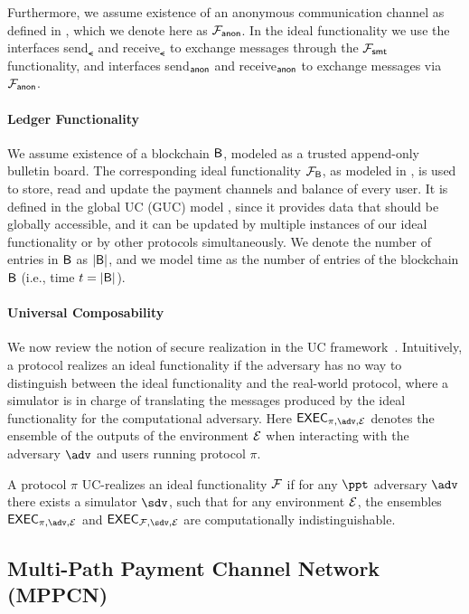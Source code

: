 Furthermore, we assume existence of an anonymous communication channel as defined in 
\cite{cl}, which we denote here as $\mathcal{F}_{\mathsf{anon}}$. In the ideal functionality we use the 
interfaces send$_\smt$ and receive$_\smt$ to exchange messages through the $\mathcal{F}_{\mathsf{smt}}$ 
functionality, and interfaces send$_{\mathsf{anon}}$ and receive$_{\mathsf{anon}}$ to exchange messages via 
$\mathcal{F}_{\mathsf{anon}}$.

\paragraph{Ledger Functionality}
We assume existence of a blockchain $\mathsf{B}$, modeled as a trusted append-only bulletin board. 
The corresponding ideal functionality $\mathcal{F}_{\mathsf{B}}$, as modeled in \cite{perun}, is used to 
store, read and update the payment channels and balance of every user. It is defined in the 
global UC (GUC) model \cite{guc}, since it provides data that should be globally accessible, 
and it can be updated by multiple instances of our ideal functionality or by other protocols 
simultaneously. We denote the number of entries in $\mathsf{B}$ as $|\mathsf{B}|$, and we model time as the 
number of entries of the blockchain $\mathsf{B}$ (i.e., time $t = |\mathsf{B}|$).

\paragraph{Universal Composability}
We now review the notion of secure realization in the UC framework~\cite{canetti}. 
Intuitively, a protocol realizes an ideal functionality if the adversary has no way 
to distinguish between the ideal functionality and the real-world protocol, where 
a simulator is in charge of translating the messages produced by the ideal functionality 
for the computational adversary. Here $\exec_{\pi, \adv, \dist}$ denotes the ensemble of 
the outputs of the environment $\mathcal{E}$ when interacting with the adversary $\adv$ and 
users running protocol $\pi$.

\begin{definition}
A protocol $\pi$ UC-realizes an ideal functionality $\mathcal{F}$ if for any $\ppt$ adversary 
$\adv$ there exists a simulator $\sdv$, such that for any environment $\mathcal{E}$, the 
ensembles $\exec_{\pi, \adv, \dist}$ and $\exec_{\FF, \sdv, \dist}$ are computationally 
indistinguishable.
\end{definition}

\subsection{Multi-Path Payment Channel Network (MPPCN)}
\label{sec:mppcn}

